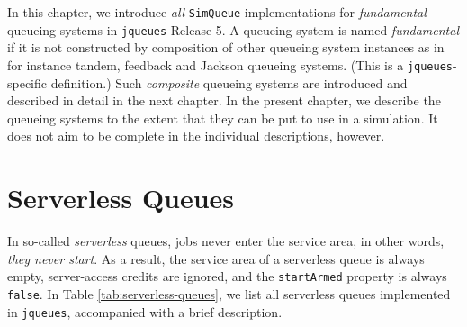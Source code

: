 In this chapter,
  we introduce {\em all\/}
  \lstinline|SimQueue| implementations
  for {\em fundamental\/}
  queueing systems in \lstinline|jqueues|
  Release 5.
A queueing system is named {\em fundamental\/} if
  it is not constructed by composition
  of other queueing system instances
  as in for instance
  tandem, feedback and Jackson queueing systems.
(This is a \texttt{jqueues}-specific definition.)
Such {\em composite\/} queueing systems
  are introduced and described in detail in
  the next chapter.
In the present chapter,
  we describe the queueing systems to the extent
  that they can be put to use in a simulation.
It does not aim to be complete
   in the individual descriptions, however.
  
\section{Serverless Queues}

In so-called {\em serverless\/} queues,
  jobs never enter the service area,
  in other words,
  {\em they never start}.
As a result,
  the service area of a serverless queue is
  always empty,
  server-access credits are ignored,
  and the \lstinline|startArmed|
  property is always \lstinline|false|.
In Table \ref{tab:serverless-queues},
  we list all serverless queues implemented in
  \lstinline|jqueues|, accompanied with a brief
  description.


